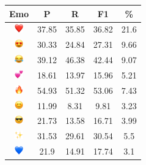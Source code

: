 \documentclass{article}
\begin{document}
\begin{table}
\centering
\begin{tabular}{|c|ccc|c|} \hline
\textbf{Emo} & \textbf{P} & \textbf{R} & \textbf{F1} & \textbf{\%} \\ \hline
\includegraphics[height=0.37cm,width=0.37cm]{img/red_heart.png} & 37.85 & 35.85 & 36.82 & 21.6\\ 
\includegraphics[height=0.37cm,width=0.37cm]{img/smiling_face_with_hearteyes.png} & 30.33 & 24.84 & 27.31 & 9.66\\ 
\includegraphics[height=0.37cm,width=0.37cm]{img/face_with_tears_of_joy.png} & 39.12 & 46.38 & 42.44 & 9.07\\ 
\includegraphics[height=0.37cm,width=0.37cm]{img/two_hearts.png} & 18.61 & 13.97 & 15.96 & 5.21\\ 
\includegraphics[height=0.37cm,width=0.37cm]{img/fire.png} & 54.93 & 51.32 & 53.06 & 7.43\\ 
\includegraphics[height=0.37cm,width=0.37cm]{img/smiling_face_with_smiling_eyes.png} & 11.99 & 8.31 & 9.81 & 3.23\\ 
\includegraphics[height=0.37cm,width=0.37cm]{img/smiling_face_with_sunglasses.png} & 21.73 & 13.58 & 16.71 & 3.99\\ 
\includegraphics[height=0.37cm,width=0.37cm]{img/sparkles.png} & 31.53 & 29.61 & 30.54 & 5.5\\ 
\includegraphics[height=0.37cm,width=0.37cm]{img/blue_heart.png} & 21.9 & 14.91 & 17.74 & 3.1\\ 

\end{tabular}
\end{table}
\end{document}
